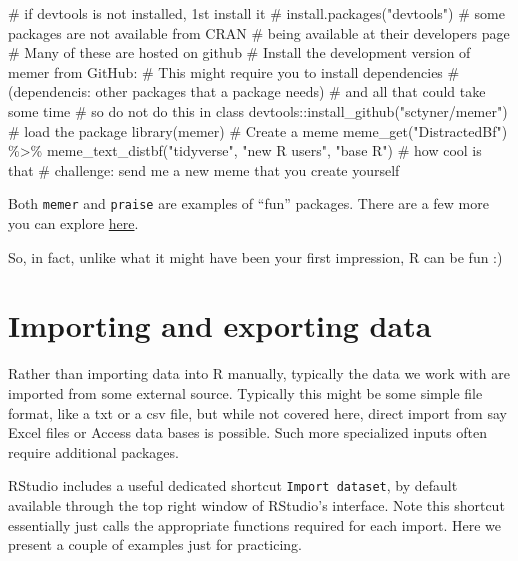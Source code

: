 \documentclass[
  letterpaper,
  DIV=11,
  numbers=noendperiod]{scrartcl}
\newenvironment{Shaded}{\begin{snugshade}}{\end{snugshade}}
\newcommand{\CommentTok}[1]{\textcolor[rgb]{0.37,0.37,0.37}{#1}}
\newcommand{\FunctionTok}[1]{\textcolor[rgb]{0.28,0.35,0.67}{#1}}
\newcommand{\NormalTok}[1]{\textcolor[rgb]{0.00,0.23,0.31}{#1}}
\newcommand{\SpecialCharTok}[1]{\textcolor[rgb]{0.37,0.37,0.37}{#1}}
\newcommand{\StringTok}[1]{\textcolor[rgb]{0.13,0.47,0.30}{#1}}
\begin{document}
\begin{Shaded}
\begin{Highlighting}[]
\CommentTok{\# if devtools is not installed, 1st install it}
\CommentTok{\# install.packages("devtools")}
\CommentTok{\# some packages are not available from CRAN}
\CommentTok{\# being available at their developers page}
\CommentTok{\# Many of these are hosted on github}
\CommentTok{\# Install the development version of memer from GitHub:}
\CommentTok{\# This might require you to install dependencies }
\CommentTok{\# (dependencis: other packages that a package needs)}
\CommentTok{\# and all that could take some time}
\CommentTok{\# so do not do this in class}
\NormalTok{devtools}\SpecialCharTok{::}\FunctionTok{install\_github}\NormalTok{(}\StringTok{"sctyner/memer"}\NormalTok{)}
\CommentTok{\# load the package}
\FunctionTok{library}\NormalTok{(memer)}
\CommentTok{\# Create a meme }
\FunctionTok{meme\_get}\NormalTok{(}\StringTok{"DistractedBf"}\NormalTok{) }\SpecialCharTok{\%\textgreater{}\%} 
  \FunctionTok{meme\_text\_distbf}\NormalTok{(}\StringTok{"tidyverse"}\NormalTok{, }\StringTok{"new R users"}\NormalTok{, }\StringTok{"base R"}\NormalTok{)}
\CommentTok{\# how cool is that}
\CommentTok{\# challenge: send me a new meme that you create yourself}
\end{Highlighting}
\end{Shaded}

Both \texttt{memer} and \texttt{praise} are examples of ``fun''
packages. There are a few more you can explore
\href{https://medium.com/geekculture/15-fun-r-packages-you-may-not-know-of-fb25a9dcd627}{here}.

So, in fact, unlike what it might have been your first impression, R can
be fun :)

\section{Importing and exporting
data}\label{importing-and-exporting-data}

Rather than importing data into R manually, typically the data we work
with are imported from some external source. Typically this might be
some simple file format, like a txt or a csv file, but while not covered
here, direct import from say Excel files or Access data bases is
possible. Such more specialized inputs often require additional
packages.

RStudio includes a useful dedicated shortcut \texttt{Import\ dataset},
by default available through the top right window of RStudio's
interface. Note this shortcut essentially just calls the appropriate
functions required for each import. Here we present a couple of examples
just for practicing.
\end{document}
